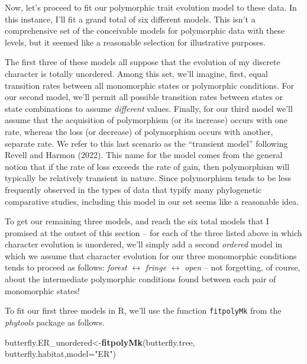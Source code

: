 \documentclass[fleqn,10pt,lineno]{wlpeerj} %
\newenvironment{Shaded}{\begin{snugshade}}{\end{snugshade}}
\newcommand{\AttributeTok}[1]{\textcolor[rgb]{0.13,0.29,0.53}{#1}}
\newcommand{\FunctionTok}[1]{\textcolor[rgb]{0.13,0.29,0.53}{\textbf{#1}}}
\newcommand{\NormalTok}[1]{#1}
\newcommand{\OtherTok}[1]{\textcolor[rgb]{0.56,0.35,0.01}{#1}}
\newcommand{\StringTok}[1]{\textcolor[rgb]{0.31,0.60,0.02}{#1}}
\begin{document}
Now, let's proceed to fit our polymorphic trait evolution model to these data. In this instance, I'll fit a grand total of six different models. This isn't a comprehensive set of the conceivable models for polymorphic data with these levels, but it seemed like a reasonable selection for illustrative purposes.

The first three of these models all suppose that the evolution of my discrete character is totally unordered. Among this set, we'll imagine, first, equal transition rates between all monomorphic states or polymorphic conditions. For our second model, we'll permit all possible transition rates between states or state combinations to assume \emph{different} values. Finally, for our third model we'll assume that the acquisition of polymorphism (or its increase) occurs with one rate, whereas the loss (or decrease) of polymorphism occurs with another, separate rate. We refer to this last scenario as the ``transient model'' following Revell and Harmon (2022). This name for the model comes from the general notion that if the rate of loss exceeds the rate of gain, then polymorphism will typically be relatively transient in nature. Since polymorphism tends to be less frequently observed in the types of data that typify many phylogenetic comparative studies, including this model in our set seems like a reasonable idea.

To get our remaining three models, and reach the six total models that I promised at the outset of this section -- for each of the three listed above in which character evolution is unordered, we'll simply add a second \emph{ordered} model in which we assume that character evolution for our three monomorphic conditions tends to proceed as follows: \emph{forest} \(\leftrightarrow\) \emph{fringe} \(\leftrightarrow\) \emph{open} -- not forgetting, of course, about the intermediate polymorphic conditions found between each pair of monomorphic states!

To fit our first three models in R, we'll use the function \texttt{fitpolyMk} from the \emph{phytools} package as follows.

\begin{Shaded}
\begin{Highlighting}[]
\NormalTok{butterfly.ER\_unordered}\OtherTok{\textless{}{-}}\FunctionTok{fitpolyMk}\NormalTok{(butterfly.tree,}
\NormalTok{  butterfly.habitat,}\AttributeTok{model=}\StringTok{"ER"}\NormalTok{)}
\end{Highlighting}
\end{Shaded}
\end{document}
